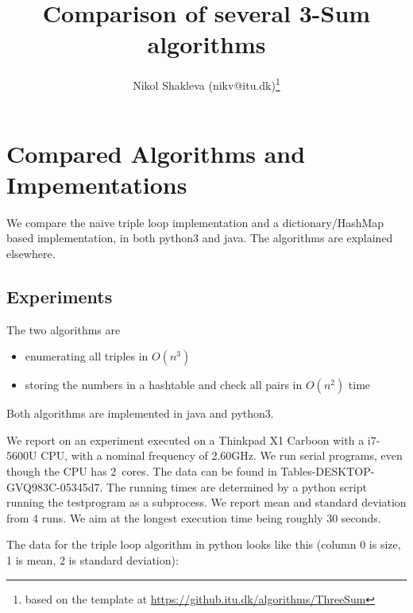 \documentclass[nobib]{tufte-handout}
\title{Comparison of several 3-Sum algorithms}
\author{Nikol Shakleva (nikv@itu.dk)\thanks{based on the template at
\url{https://github.itu.dk/algorithms/ThreeSum}}}
\begin{document}
\maketitle

\section{Compared Algorithms and Impementations}

We compare the naive triple loop implementation and a dictionary/HashMap based implementation, in both python3 and java.
The algorithms are explained elsewhere.

%

\subsection{Experiments}

The two algorithms are
\begin{itemize}
\item enumerating all triples in $O(n^3)$
\item storing the numbers in a hashtable and check all pairs in $O(n^2)$ time
\end{itemize}

Both algorithms are implemented in java and python3.


\newcommand{\tableDir}{Tables-DESKTOP-GVQ983C-05345d7}
\newcommand{\xtableDir}{Tables-APALGtraining-cce3eed}
We report on an experiment executed on a Thinkpad X1 Carboon with a i7-5600U CPU, with a  nominal frequency of 2.60GHz.
We run serial programs, even though the CPU has 2~cores.
The data can be found in \tableDir.
The running times are determined by a python script running the testprogram as a subprocess.
We report mean and standard deviation from 4 runs.
We aim at the longest execution time being roughly 30 seconds.

The data for the triple loop algorithm in python looks like this (column 0 is size, 1 is mean, 2 is standard deviation):
\end{document}
